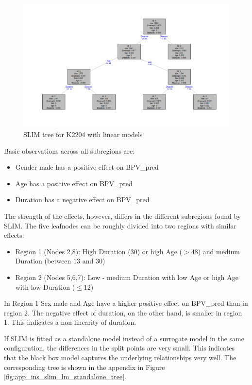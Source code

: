  \begin{figure}[!htb]
     \centering     
     \includegraphics[width = 14cm]{Figures/insurance_use_case/k2204_BPV/slim_lm_tree.png}
     \caption{SLIM tree for K2204 with linear models}
     \label{fig:ins_slim_lm_tree}
 \end{figure}

Basic observations across all subregions are:
\begin{itemize}
    \item Gender male has a positive effect on BPV\_pred
    \item Age has a positive effect on BPV\_pred
    \item Duration has a negative effect on BPV\_pred
\end{itemize}

The strength of the effects, however, differs in the different subregions found by SLIM.
The five leafnodes can be roughly divided into two regions with similar effects:
\begin{itemize}
    \item Region 1 (Nodes 2,8): High Duration ($30$) or high Age ($>48$) and medium Duration (between $13$ and $30$)
    \item Region 2 (Nodes 5,6,7): Low - medium Duration with low Age or high Age with low Duration ($\leq 12$)
\end{itemize}

In Region 1 Sex male and Age have a higher positive effect on  BPV\_pred than in region 2. The negative effect of duration, on the other hand, is smaller in region 1. This indicates a non-linearity of duration.

If SLIM is fitted as a standalone model instead of a surrogate model in the same configuration, the differences in the split points are very small. This indicates that the black box model captures the underlying relationships very well. The corresponding tree is shown in the appendix in Figure \ref{fig:app_ins_slim_lm_standalone_tree}.


